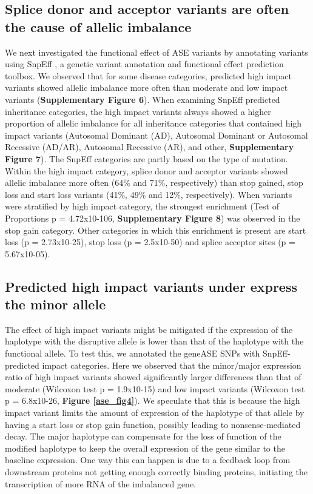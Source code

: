 {{\subsection{Splice donor and acceptor variants are often the cause of allelic imbalance}
We next investigated the functional effect of ASE variants by annotating variants using SnpEff \cite{cingolaniProgramAnnotatingPredicting2012}, a genetic variant annotation and functional effect prediction toolbox. We observed that for some disease categories, predicted high impact variants showed allelic imbalance more often than moderate and low impact variants (\textbf{Supplementary Figure 6}). When examining SnpEff predicted inheritance categories, the high impact variants always showed a higher proportion of allelic imbalance for all inheritance categories that contained high impact variants (Autosomal Dominant (AD), Autosomal Dominant or Autosomal Recessive (AD/AR), Autosomal Recessive (AR), and other, \textbf{Supplementary Figure 7}). The SnpEff categories are partly based on the type of mutation. Within the high impact category, splice donor and acceptor variants showed allelic imbalance more often (64\% and 71\%, respectively) than stop gained, stop loss and start loss variants (41\%, 49\% and 12\%, respectively). When variants were stratified by high impact category, the strongest enrichment (Test of Proportions p = 4.72x10-106, \textbf{Supplementary Figure 8}) was observed in the stop gain category. Other categories in which this enrichment is present are start loss (p = 2.73x10-25), stop loss (p = 2.5x10-50) and splice acceptor sites (p = 5.67x10-05).


\subsection{Predicted high impact variants under express the minor allele}
The effect of high impact variants might be mitigated if the expression of the haplotype with the disruptive allele is lower than that of the haplotype with the functional allele. To test this, we annotated the geneASE SNPs with SnpEff-predicted impact categories. Here we observed that the minor/major expression ratio of high impact variants showed significantly larger differences than that of moderate (Wilcoxon  test p = 1.9x10-15) and low impact variants (Wilcoxon test p = 6.8x10-26, \textbf{Figure \ref{ase_fig4}}). We speculate that this is because the high impact variant limits the amount of expression of the haplotype of that allele by having a start loss or stop gain function, possibly leading to nonsense-mediated decay. The major haplotype can compensate for the loss of function of the modified haplotype to keep the overall expression of the gene similar to the baseline expression. One way this can happen is due to a feedback loop from downstream proteins not getting enough correctly binding proteins, initiating the transcription of more RNA of the imbalanced gene. 

}}
